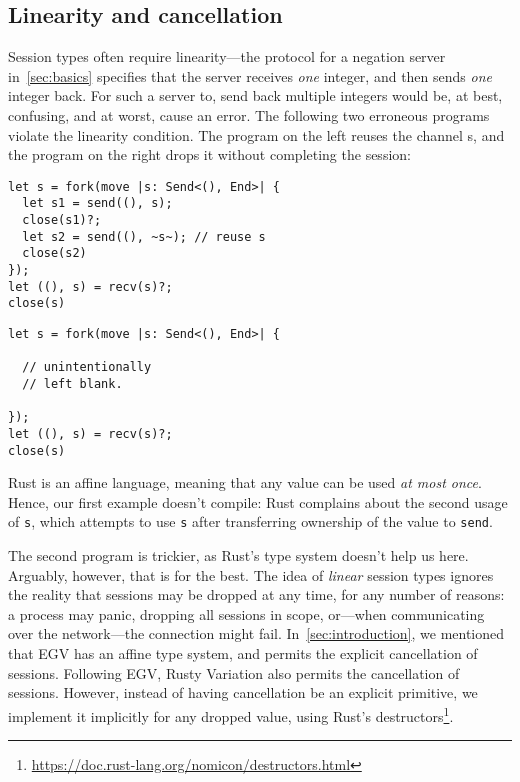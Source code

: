 \documentclass[copyright,creativecommons]{eptcs}
\begin{document}
\subsection{Linearity and cancellation}\label{sec:cancellation}
Session types often require linearity---the protocol for a negation server in~\cref{sec:basics} specifies that the server receives \emph{one} integer, and then sends \emph{one} integer back. For such a server to, \eg send back multiple integers would be, at best, confusing, and at worst, cause an error. The following two erroneous programs violate the linearity condition. The program on the left reuses the channel s, and the program on the right drops it without completing the session:

\vspace{-0.5\baselineskip}
\begin{minipage}[t]{0.5\linewidth}
\begin{lstlisting}
let s = fork(move |s: Send<(), End>| {
  let s1 = send((), s);
  close(s1)?;
  let s2 = send((), ~s~); // reuse s
  close(s2)
});
let ((), s) = recv(s)?;
close(s)
\end{lstlisting}
\end{minipage}%
\begin{minipage}[t]{0.5\linewidth}
\begin{lstlisting}
let s = fork(move |s: Send<(), End>| {
  
  // unintentionally
  // left blank.

});
let ((), s) = recv(s)?;
close(s)
\end{lstlisting}
\end{minipage}

\noindent
Rust is an affine language, meaning that any value can be used \emph{at most once}. Hence, our first example doesn't compile: Rust complains about the second usage of \lstinline{s}, which attempts to use \lstinline{s} after transferring ownership of the value to \lstinline{send}.

The second program is trickier, as Rust's type system doesn't help us here. Arguably, however, that is for the best. The idea of \emph{linear} session types ignores the reality that sessions may be dropped at any time, for any number of reasons: a process may panic, dropping all sessions in scope, or---when communicating over the network---the connection might fail. In~\cref{sec:introduction}, we mentioned that EGV has an affine type system, and permits the explicit cancellation of sessions. Following EGV, Rusty Variation also permits the cancellation of sessions. However, instead of having cancellation be an explicit primitive, we implement it implicitly for any dropped value, using Rust's destructors\footnote{\url{https://doc.rust-lang.org/nomicon/destructors.html}}.
\end{document}
